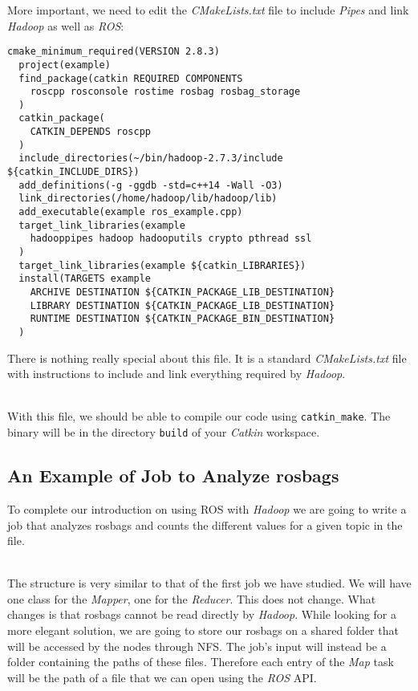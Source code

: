 \documentclass[a4paper, 12pt]{article}
\begin{document}
More important, we need to edit the \textit{CMakeLists.txt} file to include \textit{Pipes} and link \textit{Hadoop} as well as \textit{ROS}:

\begin{lstlisting}[style=xml]
  cmake_minimum_required(VERSION 2.8.3)
  project(example)
  find_package(catkin REQUIRED COMPONENTS
    roscpp rosconsole rostime rosbag rosbag_storage
  )
  catkin_package(
    CATKIN_DEPENDS roscpp
  )
  include_directories(~/bin/hadoop-2.7.3/include ${catkin_INCLUDE_DIRS})
  add_definitions(-g -ggdb -std=c++14 -Wall -O3)
  link_directories(/home/hadoop/lib/hadoop/lib)
  add_executable(example ros_example.cpp)
  target_link_libraries(example
    hadooppipes hadoop hadooputils crypto pthread ssl
  )
  target_link_libraries(example ${catkin_LIBRARIES})
  install(TARGETS example
    ARCHIVE DESTINATION ${CATKIN_PACKAGE_LIB_DESTINATION}
    LIBRARY DESTINATION ${CATKIN_PACKAGE_LIB_DESTINATION}
    RUNTIME DESTINATION ${CATKIN_PACKAGE_BIN_DESTINATION}
  )
\end{lstlisting}

There is nothing really special about this file. It is a standard \textit{CMakeLists.txt} file with instructions to include and link everything required by \textit{Hadoop}.

~\\
With this file, we should be able to compile our code using \texttt{catkin\_make}. The binary will be in the directory \texttt{build} of your \textit{Catkin} workspace.

  \subsection{An Example of Job to Analyze rosbags}

To complete our introduction on using ROS with \textit{Hadoop} we are going to write a job that analyzes rosbags and counts the different values for a given topic in the file.

~\\
The structure is very similar to that of the first job we have studied. We will have one class for the \textit{Mapper}, one for the \textit{Reducer}. This does not change. What changes is that rosbags cannot be read directly by \textit{Hadoop}. While looking for a more elegant solution, we are going to store our rosbags on a shared folder that will be accessed by the nodes through NFS. The job's input will instead be a folder containing the paths of these files. Therefore each entry of the \textit{Map} task will be the path of a file that we can open using the \textit{ROS} API.
\end{document}

